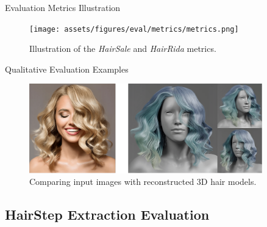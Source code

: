 \begin{frame}[t]{Evaluation Metrics Illustration}
    \begin{figure}
        \centering
        \texttt{[image: assets/figures/eval/metrics/metrics.png]}
        \caption{Illustration of the \emph{HairSale} and \emph{HairRida} metrics.}
    \end{figure}
\end{frame}

\begin{frame}[t]{Qualitative Evaluation Examples}
    \begin{figure}
        \centering
        \includegraphics[width=0.9\textwidth]{assets/figures/eval/metrics/input-output.png}
        \caption{Comparing input images with reconstructed 3D hair models.}
    \end{figure}
\end{frame}

\subsection{HairStep Extraction Evaluation}

